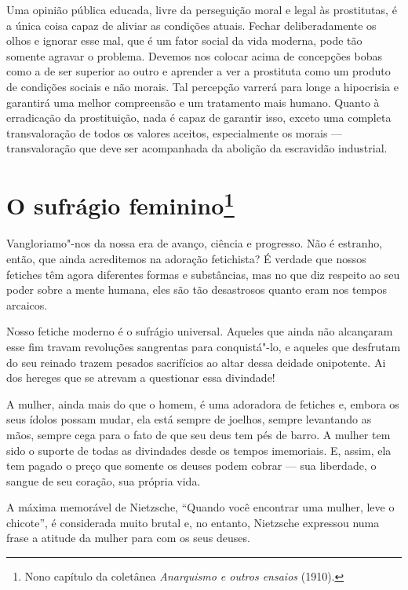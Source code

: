 Uma opinião pública educada, livre da perseguição moral e legal às
prostitutas, é a única coisa capaz de aliviar as condições atuais.
Fechar deliberadamente os olhos e ignorar esse mal, que é um fator
social da vida moderna, pode tão somente agravar o problema. Devemos nos
colocar acima de concepções bobas como a de ser superior ao outro e
aprender a ver a prostituta como um produto de condições sociais e não
morais. Tal percepção varrerá para longe a hipocrisia e garantirá uma
melhor compreensão e um tratamento mais humano. Quanto à erradicação da
prostituição, nada é capaz de garantir isso, exceto uma completa
transvaloração de todos os valores aceitos, especialmente os morais --- transvaloração que deve ser acompanhada da abolição da escravidão
industrial.

\chapter{O sufrágio feminino\footnote[*]{Nono capítulo da coletânea \emph{Anarquismo
  e outros ensaios} (1910).}}

Vangloriamo"-nos da nossa era de avanço, ciência e progresso. Não é
estranho, então, que ainda acreditemos na adoração fetichista? É verdade
que nossos fetiches têm agora diferentes formas e substâncias, mas no
que diz respeito ao seu poder sobre a mente humana, eles são tão
desastrosos quanto eram nos tempos arcaicos.

Nosso fetiche moderno é o sufrágio universal. Aqueles que ainda não
alcançaram esse fim travam revoluções sangrentas para conquistá"-lo, e
aqueles que desfrutam do seu reinado trazem pesados ​​sacrifícios ao
altar dessa deidade onipotente. Ai dos hereges que se atrevam a
questionar essa divindade!

A mulher, ainda mais do que o homem, é uma adoradora de fetiches e,
embora os seus ídolos possam mudar, ela está sempre de joelhos, sempre
levantando as mãos, sempre cega para o fato de que seu deus tem pés de
barro. A mulher tem sido o suporte de todas as divindades desde os tempos
imemoriais. E, assim, ela tem pagado o preço que somente os deuses podem
cobrar --- sua liberdade, o sangue de seu coração, sua própria vida.

A máxima memorável de Nietzsche, ``Quando você encontrar uma mulher,
leve o chicote'', é considerada muito brutal e, no entanto, Nietzsche
expressou numa frase a atitude da mulher para com os seus deuses.

